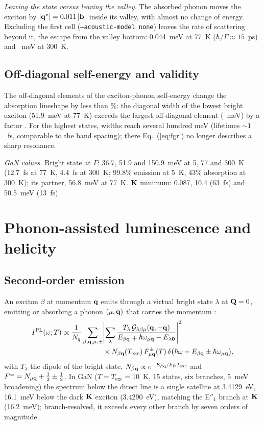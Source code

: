\emph{Leaving the state versus leaving the valley.} The absorbed phonon moves the
exciton by $|\mathbf{q}^*|=0.011\,|\mathbf{b}|$ inside its valley, with almost no change of
energy. Excluding the first cell (\texttt{--acoustic-model none}) leaves the rate
of scattering beyond it, the escape from the valley bottom: 0.044~meV at 77~K
($\hbar/\Gamma\approx15$~ps) and ~meV at 300~K.

\subsection{Off-diagonal self-energy and validity}
The off-diagonal elements of the exciton-phonon self-energy \cite{Chan2023}
change the absorption lineshape by less than \%: the diagonal width of
the lowest bright exciton (51.9~meV at 77~K) exceeds the largest off-diagonal
element (~meV) by a factor . For the highest states, widths reach
several hundred meV (lifetimes $\sim1$~fs, comparable to the band spacing); there
Eq.~(\ref{eq:fgr}) no longer describes a sharp resonance.

\emph{GaN values.} Bright state at $\Gamma$: 36.7, 51.9 and 150.9~meV at 5, 77 and
300~K (12.7~fs at 77~K, 4.4~fs at 300~K; 99.8\% emission at 5~K, 43\% absorption
at 300~K); its partner, 56.8~meV at 77~K. $\mathbf{K}$ minimum: 0.087, 10.4 (63~fs) and
50.5~meV (13~fs).

\section{Phonon-assisted luminescence and helicity}
\label{sec:pl}

\subsection{Second-order emission}
An exciton $\beta$ at momentum $\mathbf{q}$ emits through a virtual bright state
$\lambda$ at $\mathbf{Q}=0$, emitting or absorbing a phonon $(\mu,\mathbf{q})$ that carries the
momentum \cite{Cannuccia2019,Paleari2019}:
\begin{equation}
\begin{split}
I^{\mathrm{PL}}(\omega;T)\propto\frac{1}{N_q}\sum_{\beta,\mathbf{q},\mu,\pm}
&\Biggl|\sum_{\lambda}\frac{T_\lambda\,\mathcal{G}_{\lambda\beta\mu}(\mathbf{q},-\mathbf{q})}
{E_{\beta\mathbf{q}}\mp\hbar\omega_{\mu\mathbf{q}}-E_{\lambda\mathbf{0}}}\Biggr|^2\\
&\times N_{\beta\mathbf{q}}(T_{\mathrm{exc}})\,F^{\pm}_{\mu\mathbf{q}}(T)\,
\delta\bigl(\hbar\omega-E_{\beta\mathbf{q}}\pm\hbar\omega_{\mu\mathbf{q}}\bigr),
\end{split}
\label{eq:pl}
\end{equation}
with $T_\lambda$ the dipole of the bright state,
$N_{\beta\mathbf{q}}\propto e^{-E_{\beta\mathbf{q}}/k_BT_{\mathrm{exc}}}$ and
$F^\pm=N_{\mu\mathbf{q}}+\tfrac12\pm\tfrac12$. In GaN ($T=T_{\mathrm{exc}}=10$~K, 15
states, six branches, 5~meV broadening) the spectrum below the direct line is a
single satellite at 3.4129~eV, 16.1~meV below the dark $\mathbf{K}$ exciton
(3.4290~eV), matching the E$''_1$ branch at $\mathbf{K}$ (16.2~meV); branch-resolved, it
exceeds every other branch by seven orders of magnitude.

